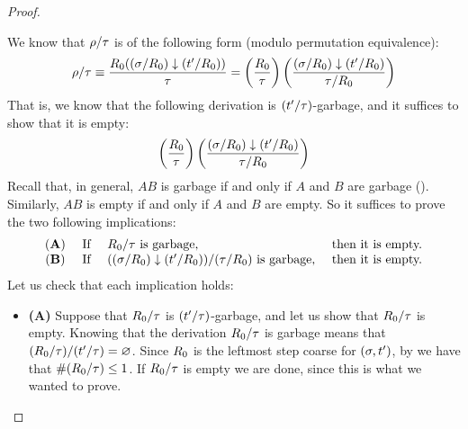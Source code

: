 \begin{proof}
\begin{itemize}
\begin{enumerate}
    We know that $\rho/\tau$ is of the following form (modulo permutation equivalence):
    \[
       \rho/\tau \equiv
       \frac{R_0((\sigma/R_0) \downarrow (t'/R_0))}{\tau}
       =
       \left(\frac{R_0}{\tau}\right) \left(\frac{(\sigma/R_0) \downarrow (t'/R_0)}{\tau/R_0}\right)
    \]
    That is, we know that the following derivation is $(t'/\tau)$-garbage,
    and it suffices to show that it is empty:
    \[
      \left(\frac{R_0}{\tau}\right) \left(\frac{(\sigma/R_0) \downarrow (t'/R_0)}{\tau/R_0}\right)
    \]
    Recall that, in general, $AB$ is garbage if and only if $A$ and $B$ are garbage ().
    Similarly, $AB$ is empty if and only if $A$ and $B$ are empty.
    So it suffices to prove the two following implications:
    \[
      \begin{array}{clll}
      {\bf (A)} &
      \text{ If } & R_0/\tau \text{ is garbage,} & \text{ then it is empty.} \\
      {\bf (B)} &
      \text{ If } & ((\sigma/R_0) \downarrow (t'/R_0))/(\tau/R_0) \text{ is garbage,} & \text{ then it is empty.}
      \end{array}
    \]
    Let us check that each implication holds:
    \begin{itemize}
    \item {\bf (A)}
      Suppose that $R_0/\tau$ is $(t'/\tau)$-garbage,
      and let us show that $R_0/\tau$ is empty.
      Knowing that the derivation $R_0/\tau$ is garbage means that
      $(R_0/\tau)/(t'/\tau) = \varnothing$.
      Since $R_0$ is the leftmost step coarse for $(\sigma,t')$,
      by 
      we have that $\#(R_0/\tau) \leq 1$.
      If $R_0/\tau$ is empty we are done, since this is what we wanted to prove.


\end{itemize}
\end{enumerate}
\end{itemize}
\end{proof}
